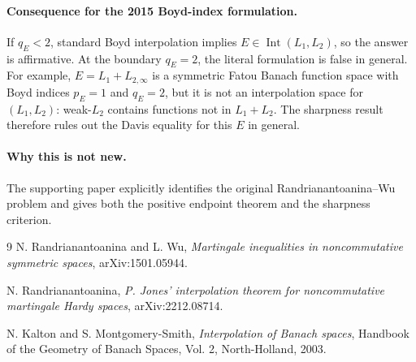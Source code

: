 \documentclass[11pt]{article}
\newcommand{\Int}{\operatorname{Int}}
\begin{document}
\paragraph{Consequence for the 2015 Boyd-index formulation.}
If \(q_E<2\), standard Boyd interpolation implies \(E\in\Int(L_1,L_2)\), so
the answer is affirmative. At the boundary \(q_E=2\), the literal formulation
is false in general. For example, \(E=L_1+L_{2,\infty}\) is a symmetric Fatou
Banach function space with Boyd indices \(p_E=1\) and \(q_E=2\), but it is not
an interpolation space for \((L_1,L_2)\): weak-\(L_2\) contains functions not in
\(L_1+L_2\). The sharpness result therefore rules out the Davis equality for
this \(E\) in general.

\paragraph{Why this is not new.}
The supporting paper explicitly identifies the original Randrianantoanina--Wu
problem and gives both the positive endpoint theorem and the sharpness
criterion.

\begin{thebibliography}{9}
N. Randrianantoanina and L. Wu,
\emph{Martingale inequalities in noncommutative symmetric spaces},
arXiv:1501.05944.

N. Randrianantoanina,
\emph{P. Jones' interpolation theorem for noncommutative martingale Hardy
spaces},
arXiv:2212.08714.

N. Kalton and S. Montgomery-Smith,
\emph{Interpolation of Banach spaces},
Handbook of the Geometry of Banach Spaces, Vol. 2, North-Holland, 2003.
\end{thebibliography}
\end{document}
